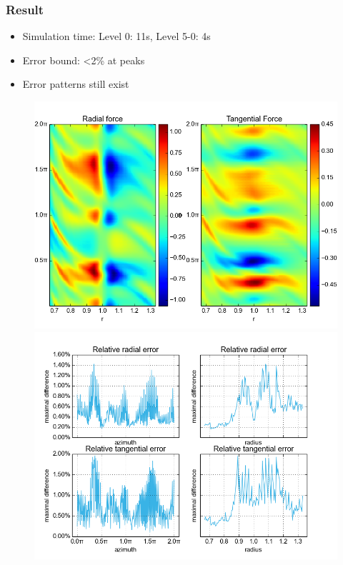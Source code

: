 \documentclass{beamer}
\begin{document}
\begin{frame}
 \frametitle{Result}
\begin{itemize}
  \item Simulation time: Level 0: 11s, Level 5-0: 4s
  \item Error bound: \textless 2\% at peaks
  \item Error patterns still exist
 \end{itemize}

 \begin{figure}[H]
  \centering
  \includegraphics[width=.5\textwidth]{../../../Sara/run/default/forcesA-euclid.png}     \includegraphics[width=.5\textwidth]{../../../Sara/run/default/diff_1D.png}
\end{figure}
\end{frame}
\end{document}
